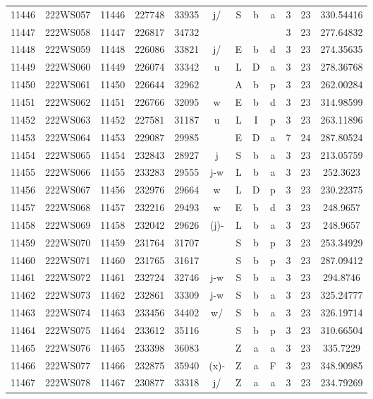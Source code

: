 \begin{tabular}{|*{12}{c|}}
11446 & 222WS057 & 11446 & 227748 & 33935 & j/ & S & b & a & 3 & 23 & 330.54416 \\ 
11447 & 222WS058 & 11447 & 226817 & 34732 &  &  &  &  & 3 & 23 & 277.64832 \\ 
11448 & 222WS059 & 11448 & 226086 & 33821 & j/ & E & b & d & 3 & 23 & 274.35635 \\ 
11449 & 222WS060 & 11449 & 226074 & 33342 & u & L & D & a & 3 & 23 & 278.36768 \\ 
11450 & 222WS061 & 11450 & 226644 & 32962 &  & A & b & p & 3 & 23 & 262.00284 \\ 
11451 & 222WS062 & 11451 & 226766 & 32095 & w & E & b & d & 3 & 23 & 314.98599 \\ 
11452 & 222WS063 & 11452 & 227581 & 31187 & u & L & I & p & 3 & 23 & 263.11896 \\ 
11453 & 222WS064 & 11453 & 229087 & 29985 &  & E & D & a & 7 & 24 & 287.80524 \\ 
11454 & 222WS065 & 11454 & 232843 & 28927 & j & S & b & a & 3 & 23 & 213.05759 \\ 
11455 & 222WS066 & 11455 & 233283 & 29555 & j-w & L & b & a & 3 & 23 & 252.3623 \\ 
11456 & 222WS067 & 11456 & 232976 & 29664 & w & L & D & p & 3 & 23 & 230.22375 \\ 
11457 & 222WS068 & 11457 & 232216 & 29493 & w & E & b & d & 3 & 23 & 248.9657 \\ 
11458 & 222WS069 & 11458 & 232042 & 29626 & (j)- & L & b & a & 3 & 23 & 248.9657 \\ 
11459 & 222WS070 & 11459 & 231764 & 31707 &  & S & b & p & 3 & 23 & 253.34929 \\ 
11460 & 222WS071 & 11460 & 231765 & 31617 &  & S & b & p & 3 & 23 & 287.09412 \\ 
11461 & 222WS072 & 11461 & 232724 & 32746 & j-w & S & b & a & 3 & 23 & 294.8746 \\ 
11462 & 222WS073 & 11462 & 232861 & 33309 & j-w & S & b & a & 3 & 23 & 325.24777 \\ 
11463 & 222WS074 & 11463 & 233456 & 34402 & w/ & S & b & a & 3 & 23 & 326.19714 \\ 
11464 & 222WS075 & 11464 & 233612 & 35116 &  & S & b & p & 3 & 23 & 310.66504 \\ 
11465 & 222WS076 & 11465 & 233398 & 36083 &  & Z & a & a & 3 & 23 & 335.7229 \\ 
11466 & 222WS077 & 11466 & 232875 & 35940 & (x)- & Z & a & F & 3 & 23 & 348.90985 \\ 
11467 & 222WS078 & 11467 & 230877 & 33318 & j/ & Z & a & a & 3 & 23 & 234.79269 \\ 

\end{tabular}
